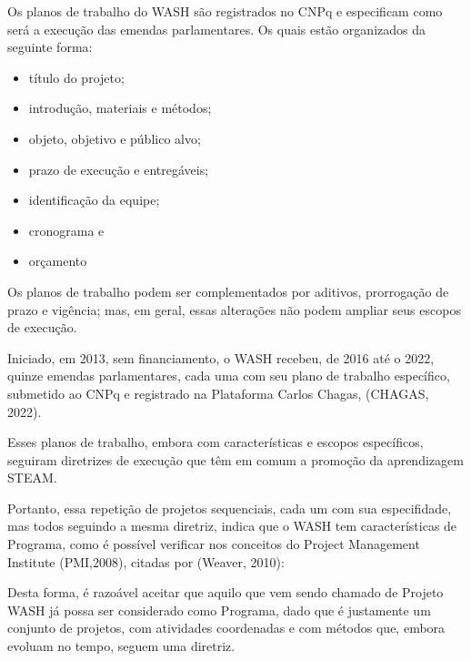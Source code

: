 Os planos de trabalho do WASH são registrados no CNPq e especificam como será a execução das emendas parlamentares. Os quais estão organizados da seguinte forma:


\begin{itemize}
\item título do projeto;
\item introdução, materiais e métodos;
\item objeto, objetivo e público alvo;
\item prazo de execução e entregáveis;
\item identificação da equipe;
\item cronograma e
\item orçamento
\end{itemize}

Os planos de trabalho podem ser complementados por aditivos, prorrogação de prazo e vigência; mas, em geral, essas alterações não podem ampliar seus escopos de execução.

Iniciado, em 2013, sem financiamento, o WASH recebeu, de 2016 até o 2022, quinze emendas parlamentares, cada uma com seu plano de trabalho específico, submetido ao CNPq e registrado na Plataforma Carlos Chagas, (CHAGAS, 2022).

Esses planos de trabalho, embora com características e escopos específicos, seguiram diretrizes de execução que têm em comum a promoção da aprendizagem STEAM.

Portanto, essa repetição de projetos sequenciais, cada um com sua especifidade, mas todos seguindo a mesma diretriz, indica que o WASH tem características de Programa, como é possível verificar nos conceitos do Project Management Institute  (PMI,2008), citadas por  (Weaver, 2010):


\noindent\begin{center}\mbox{\centering{}}\end{center}


Desta forma, é razoável aceitar que aquilo que vem sendo chamado de Projeto WASH já possa ser considerado como Programa, dado que é justamente um conjunto de projetos, com atividades coordenadas e com métodos que, embora evoluam no tempo, seguem uma diretriz.

